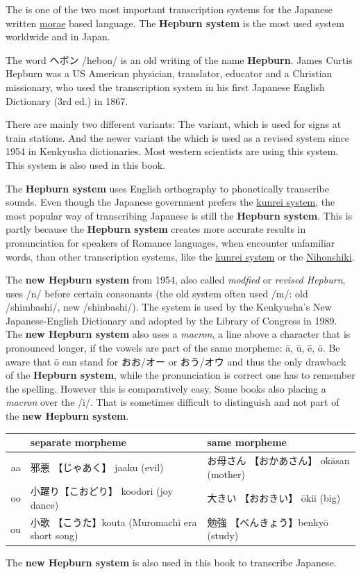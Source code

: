 The \lhepburnsystem{} is one of the two most important transcription systems
for the Japanese written \hyperref[sec:Mora]{morae} based language. The
\textbf{Hepburn system} is the most used system worldwide and in Japan.

The word {ヘボン} /hebon/ is an old writing of the name \textbf{Hepburn}. James
Curtis Hepburn was a US American physician, translator, educator and a
Christian missionary, who used the transcription system in his first Japanese
English Dictionary (3rd ed.) in 1867.

There are mainly two different variants: The \loldhepburnsystem{} variant,
which is used for signs at train stations. And the newer variant the
\lnewhepburnsystem{} which is used as a revised system since 1954 in Kenkyusha
dictionaries. Most western scientists are using this system. This system is
also used in this book.

The \textbf{Hepburn system} uses English orthography to phonetically transcribe
sounds.  Even though the Japanese government prefers the
\hyperref[sec:Kunrei]{kunrei system}, the most popular way of transcribing
Japanese is still the \textbf{Hepburn system}. This is partly because the
\textbf{Hepburn system} creates more accurate results in pronunciation for
speakers of Romance languages, when encounter unfamiliar words, than other
transcription systems, like the \hyperref[sec:Kunrei]{kunrei system} or the
\hyperref[sec:Kunrei]{Nihonshiki}.

The \textbf{new Hepburn system} from 1954, also called \textit{modfied} or
\textit{revised Hepburn}, uses /n/ before certain consonants (the old system
often used /m/: old /shimbashi/, new /shinbashi/). The system is used by the
Kenkyusha's New Japanese-English Dictionary and adopted by the Library of
Congress in 1989.  The \textbf{new Hepburn system} also uses a \textit{macron},
a line above a character that is pronounced longer, if the vowels are part of
the same morpheme: ā, ū, ē, ō. Be aware that ō can stand for おお/オー or
おう/オウ and thus the only drawback of the \textbf{Hepburn system}, while the
pronunciation is correct one has to remember the spelling. However this is
comparatively easy. Some books also placing a \textit{macron} over the /i/.
That is sometimes difficult to distinguish and not part of the \textbf{new
Hepburn system}.\medskip

\begin{tabular}{r|l|l}
        &\textbf{separate morpheme}&\textbf{same morpheme}\\\hline
        aa&邪悪 【じゃあく】 jaaku (evil)& お母さん 【おかあさん】 okāsan (mother)\\
        oo&小躍り【こおどり】 koodori (joy dance)& 大きい 【おおきい】 ōkii (big)\\
        ou&小歌 【こうた】kouta (Muromachi era short song)& 勉強 【べんきょう】benkyō (study)\\
\end{tabular}
\medskip

The \textbf{new Hepburn system} is also used in this book to transcribe Japanese.


